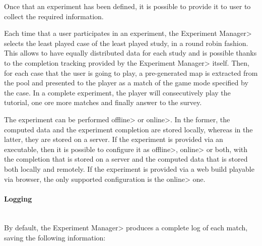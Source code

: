 {\setlength{\parindent}{0cm}
Once that an experiment has been defined, it is possible to provide it to user to collect the required information.}

\par

Each time that a user participates in an experiment, the \<Experiment Manager> selects the least played case of the least played study, in a round robin fashion. This allows to have equally distributed data for each study and is possible thanks to the completion tracking provided by the \<Experiment Manager> itself. Then, for each case that the user is going to play, a pre-generated map is extracted from the pool and presented to the player as a match of the game mode specified by the case. In a complete experiment, the player will consecutively play the tutorial, one ore more matches and finally answer to the survey.

\par

The experiment can be performed \<offline> or \<online>. In the former, the computed data and the experiment completion are stored locally, whereas in the latter, they are stored on a server. If the experiment is provided via an executable, then it is possible to configure it as \<offline>, \<online> or both, with the completion that is stored on a server and the computed data that is stored both locally and remotely. If the experiment is provided via a web build playable via browser, the only supported configuration is the \<online> one. 

\paragraph{Logging}

\mbox{}\\

{\setlength{\parindent}{0cm}
By default, the \<Experiment Manager> produces a complete log of each match, saving the following information:}

